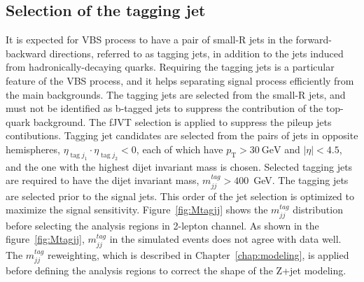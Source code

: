 \subsection{Selection of the tagging jet}
It is expected for VBS process to have a pair of small-R jets in the forward-backward directions, referred to as tagging jets, in addition to the jets induced from hadronically-decaying quarks.
Requiring the tagging jets is a particular feature of the VBS process, and it helps separating signal process efficiently from the main backgrounds.
The tagging jets are selected from the small-R jets, and must not be identified as b-tagged jets to suppress the contribution of the top-quark background. 
The fJVT selection is applied to suppress the pileup jets contibutions. Tagging jet candidates are selected from the pairs of jets in opposite hemispheres, $\eta_{\operatorname{tag} j_{1}} \cdot \eta_{\operatorname{tag} j_{2}}<0$, each of which have $p_\mathrm{T} > 30~\mathrm{GeV}$ and $|\eta| < 4.5$, and the one with the highest dijet invariant mass is chosen.  
Selected tagging jets are required to have the dijet invariant mass, $m^{tag}_{jj} > 400$~GeV.
The tagging jets are selected prior to the signal jets. This order of the jet selection is optimized to maximize the signal sensitivity.
Figure~\ref{fig:Mtagjj} shows the $m^{tag}_{jj}$ distribution before selecting the analysis regions in 2-lepton channel.
As shown in the figure~\ref{fig:Mtagjj}, $m^{tag}_{jj}$ in the simulated events does not agree with data well.
The $m^{tag}_{jj}$ reweighting, which is described in Chapter~\ref{chap:modeling}, is applied before defining the analysis regions to correct the shape of the Z+jet modeling.
